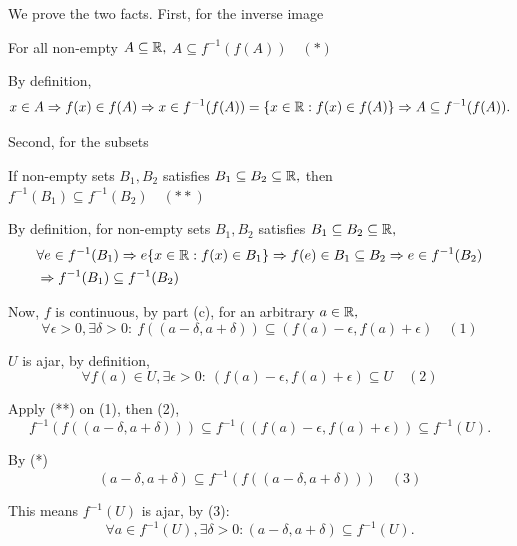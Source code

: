 \documentclass{article}
\begin{document}
\begin{soln}
    We prove the two facts. First, for the inverse image

    \begin{claim*}
        For all non-empty $A \subseteq \mathbb R,$ $A \subseteq f^{-1}(f(A)) \quad (*)$  
    \end{claim*}
    \begin{subproof}
        By definition,
        \[
            x \in A \Rightarrow f(x) \in f(A) \Rightarrow x \in f^{-1}(f(A)) = \{ x \in \mathbb R: f(x) \in f(A) \}
            \Rightarrow A \subseteq f^{-1}(f(A)).
        \]
    \end{subproof}

    Second, for the subsets
    \begin{claim*}
        If non-empty sets $B_1, B_2$ satisfies $B_1 \subseteq B_2 \subseteq \mathbb R,$ then $f^{-1}(B_1) \subseteq f^{-1} (B_2) \quad (**)$ 
    \end{claim*}
    \begin{subproof}
        By definition, for non-empty sets $B_1, B_2$ satisfies $B_1 \subseteq B_2 \subseteq \mathbb R,$
        \[
            \begin{aligned}
                &\forall e \in f^{-1}(B_1) \Rightarrow e \{ x \in \mathbb R: f(x) \in B_1 \} \Rightarrow f(e) \in B_1 \subseteq B_2 \Rightarrow e \in f^{-1}(B_2)\\
                &\Rightarrow f^{-1}(B_1) \subseteq f^{-1} (B_2)
            \end{aligned}
        \]
    \end{subproof}

    Now, $f$ is continuous, by part (c), for an arbitrary $a \in \mathbb R,$
    \[
        \forall \epsilon > 0, \exists \delta > 0:\ f((a-\delta, a+\delta)) \subseteq (f(a) - \epsilon, f(a) + \epsilon) \quad (1)
    \]

    $U$ is ajar, by definition,
    \[
        \forall f(a) \in U, \exists \epsilon > 0:\ (f(a)-\epsilon, f(a)+\epsilon) \subseteq U \quad (2)
    \]

    Apply (**) on (1), then (2),
    \[
        f^{-1}(f((a-\delta, a+\delta))) \subseteq f^{-1}((f(a) - \epsilon, f(a) + \epsilon)) \subseteq f^{-1}(U).
    \]

    By (*)
    \[
        (a-\delta, a+\delta) \subseteq f^{-1}(f((a-\delta, a+\delta))) \quad (3)
    \]

    This means $f^{-1}(U)$ is ajar, by (3):
    \[
        \forall a \in f^{-1}(U), \exists \delta > 0: (a-\delta, a+\delta) \subseteq f^{-1}(U).
    \]
\end{soln}
\end{document}
